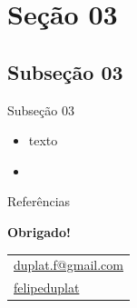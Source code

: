 \documentclass[aspectratio=169, 9pt]{beamer}
\begin{document}
\section{Seção 03}

\subsection[]{Subseção 03}

\begin{frame}{Subseção 03}
	\begin{itemize}[<+->]
		\item texto
		\item 
	\end{itemize}
\end{frame}



\begin{frame}{Referências}
\printbibliography
\end{frame}


\begin{frame}
	\begin{center}
			\textbf{Obrigado!} \\
			\vspace{0.5cm}
			
			\begin{tabular}{l}
				\faAt \hspace{0.001mm} \href{mailto:duplat.f@gmail.com}{duplat.f@gmail.com} \\
				\faLinkedin \hspace{0.001mm} \href{https://www.linkedin.com/in/felipeduplat/}{felipeduplat}
			\end{tabular}
		\end{center}
\end{frame}
\end{document}
